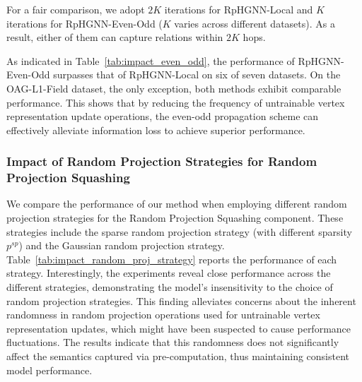 \documentclass[lettersize,journal]{IEEEtran}
\begin{document}
For a fair comparison, we adopt $2K$ iterations for RpHGNN-Local and $K$ iterations for RpHGNN-Even-Odd ($K$ varies across different datasets).
As a result, either of them can capture relations within $2K$ hops.



As indicated in Table~\ref{tab:impact_even_odd}, the performance of RpHGNN-Even-Odd surpasses that of RpHGNN-Local on six of seven datasets.
On the OAG-L1-Field dataset, the only exception, both methods exhibit comparable performance. 
This shows that by reducing the frequency of untrainable vertex representation update operations, the even-odd propagation scheme can effectively alleviate information loss to achieve superior performance.






\subsubsection{Impact of Random Projection Strategies for Random Projection Squashing}\label{sec:impact_rand_proj}

We compare the performance of our method when employing different random projection strategies for the Random Projection Squashing component.
These strategies include the sparse random projection strategy (with different sparsity $p^{sp}$) and the Gaussian random projection strategy.
Table~\ref{tab:impact_random_proj_strategy} reports the performance of each strategy.
Interestingly, the experiments reveal close performance across the different strategies, demonstrating the model’s insensitivity to the choice of random projection strategies.
This finding alleviates concerns about the inherent randomness in random projection operations used for untrainable vertex representation updates, which might have been suspected to cause performance fluctuations. 
The results indicate that this randomness does not significantly affect the semantics captured via pre-computation, thus maintaining consistent model performance.
\end{document}
